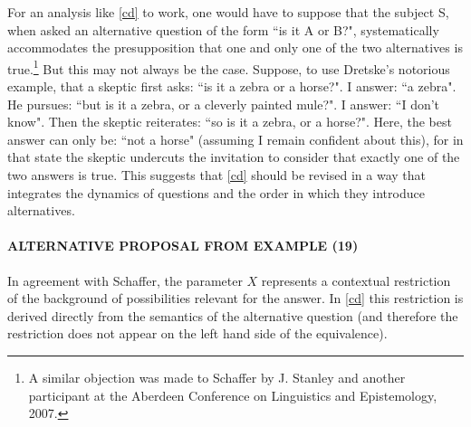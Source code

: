 

For an analysis like \ref{cd} to work, one would have to suppose
that the subject S, when asked an alternative question of the form
``is it A or B?", systematically accommodates the presupposition
that one and only one of the two alternatives is true.\footnote{A
similar objection was made to Schaffer by J. Stanley and another
participant at the Aberdeen Conference on Linguistics and
Epistemology, 2007.} But this may not always be the case. Suppose,
to use Dretske's notorious example, that a skeptic first asks:
``is it a zebra or a horse?". I answer: ``a zebra". He pursues:
``but is it a zebra, or a cleverly painted mule?". I answer: ``I
don't know". Then the skeptic reiterates: ``so is it a zebra, or a
horse?". Here, the best answer can only be: ``not a horse"
(assuming I remain confident about this), for in that state the
skeptic undercuts the invitation to consider that exactly one of
the two answers is true. This suggests that \ref{cd} should be
revised in a way that integrates the dynamics of questions and the
order in which they introduce alternatives.

 

 

\paragraph{ALTERNATIVE PROPOSAL FROM EXAMPLE (19) } 

  
In agreement with Schaffer, the parameter $X$ represents a
contextual restriction of the background of possibilities relevant
for the answer. In \ref{cd} this restriction is derived directly
from the semantics of the alternative question (and therefore the
restriction does not appear on the left hand side of the
equivalence).  


